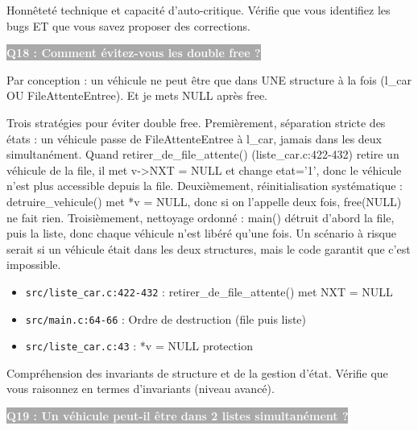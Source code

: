 \documentclass[12pt,a4paper]{article}
\newcommand{\question}[1]{%
    \vspace{0.5cm}
    \noindent\colorbox{darkgray}{\textcolor{white}{\textbf{#1}}}
    \vspace{0.3cm}
}
\begin{document}
\begin{objectif_prof}
Honnêteté technique et capacité d'auto-critique. Vérifie que vous identifiez les bugs ET que vous savez proposer des corrections.
\end{objectif_prof}

\question{Q18 : Comment évitez-vous les double free ?}

\begin{reponse_courte}
Par conception : un véhicule ne peut être que dans UNE structure à la fois (l\_car OU FileAttenteEntree). Et je mets NULL après free.
\end{reponse_courte}

\begin{reponse_longue}
Trois stratégies pour éviter double free. Premièrement, séparation stricte des états : un véhicule passe de FileAttenteEntree à l\_car, jamais dans les deux simultanément. Quand retirer\_de\_file\_attente() (liste\_car.c:422-432) retire un véhicule de la file, il met v->NXT = NULL et change etat='1', donc le véhicule n'est plus accessible depuis la file. Deuxièmement, réinitialisation systématique : detruire\_vehicule() met *v = NULL, donc si on l'appelle deux fois, free(NULL) ne fait rien. Troisièmement, nettoyage ordonné : main() détruit d'abord la file, puis la liste, donc chaque véhicule n'est libéré qu'une fois. Un scénario à risque serait si un véhicule était dans les deux structures, mais le code garantit que c'est impossible.
\end{reponse_longue}

\begin{reference_code}
\begin{itemize}
    \item \texttt{src/liste\_car.c:422-432} : retirer\_de\_file\_attente() met NXT = NULL
    \item \texttt{src/main.c:64-66} : Ordre de destruction (file puis liste)
    \item \texttt{src/liste\_car.c:43} : *v = NULL protection
\end{itemize}
\end{reference_code}

\begin{objectif_prof}
Compréhension des invariants de structure et de la gestion d'état. Vérifie que vous raisonnez en termes d'invariants (niveau avancé).
\end{objectif_prof}

\question{Q19 : Un véhicule peut-il être dans 2 listes simultanément ?}
\end{document}
